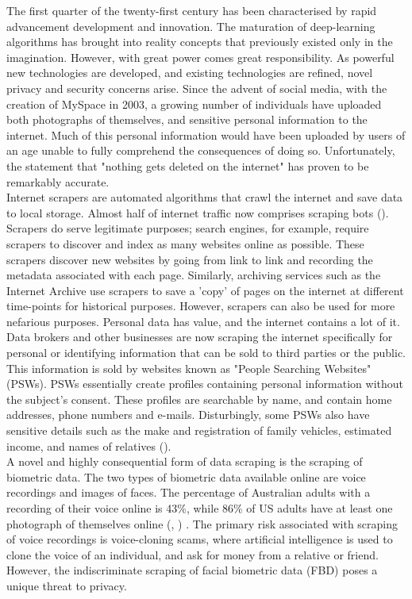 \documentclass{article}
\begin{document}
The first quarter of the twenty-first century has been characterised by rapid advancement development and innovation. The maturation of deep-learning algorithms has brought into reality concepts that previously existed only in the imagination. However, with great power comes great responsibility. As powerful new technologies are developed, and existing technologies are refined, novel privacy and security concerns arise. Since the advent of social media, with the creation of MySpace in 2003, a growing number of individuals have uploaded both photographs of themselves, and sensitive personal information to the internet. Much of this personal information would have been uploaded by users of an age unable to fully comprehend the consequences of doing so. Unfortunately, the statement that "nothing gets deleted on the internet" has proven to be remarkably accurate.
\vspace{0.3cm} \\ 
Internet scrapers are automated algorithms that crawl the internet and save data to local storage. Almost half of internet traffic now comprises scraping bots (\cite{conde2024five}). Scrapers do serve legitimate purposes; search engines, for example, require scrapers to discover and index as many websites online as possible. These scrapers discover new websites by going from link to link and recording the metadata associated with each page. Similarly, archiving services such as the Internet Archive use scrapers to save a 'copy' of pages on the internet at different time-points for historical purposes. However, scrapers can also be used for more nefarious purposes. Personal data has value, and the internet contains a lot of it. Data brokers and other businesses are now scraping the internet specifically for personal or identifying information that can be sold to third parties or the public.
\vspace{0.3cm} \\
This information is sold by websites known as "People Searching Websites" (PSWs). PSWs essentially create profiles containing personal information without the subject's consent. These profiles are searchable by name, and contain home addresses, phone numbers and e-mails. Disturbingly, some PSWs also have sensitive details such as the make and registration of family vehicles, estimated income, and names of relatives (\cite{take2024expect}).
\vspace{0.3cm} \\
A novel and highly consequential form of data scraping is the scraping of biometric data. The two types of biometric data available online are voice recordings and images of faces. The percentage of Australian adults with a recording of their voice online is 43\%, while 86\% of US adults have at least one photograph of themselves online (\cite{CyberSecurity2023}, \cite{YouGov2022}) . The primary risk associated with scraping of voice recordings is voice-cloning scams, where artificial intelligence is used to clone the voice of an individual, and ask for money from a relative or friend. However, the indiscriminate scraping of facial biometric data (FBD) poses a unique threat to privacy.
\end{document}
